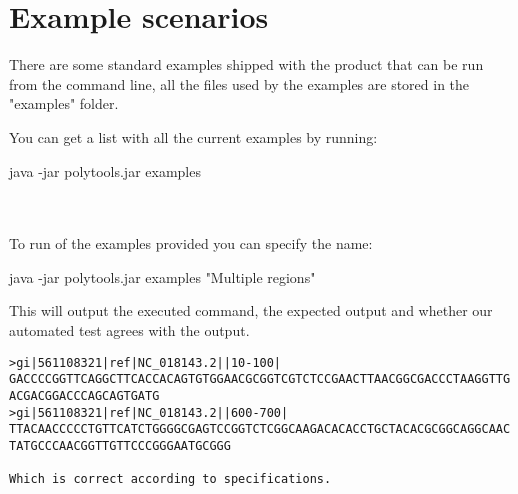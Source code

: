 \section{Example scenarios}
There are some standard examples shipped with the product that can be run from the command line, all the files used by the examples are stored in the "examples" folder.

You can get a list with all the current examples by running:\\
\begin{markdown}
java -jar polytools.jar examples
\end{markdown}
\\
\\
To run of the examples provided you can specify the name:
\\
\begin{markdown}
java -jar polytools.jar examples "Multiple regions"
\end{markdown}

This will output the executed command, the expected output and 
whether our automated test agrees with the output.
\begin{verbatim}
>gi|561108321|ref|NC_018143.2||10-100|
GACCCCGGTTCAGGCTTCACCACAGTGTGGAACGCGGTCGTCTCCGAACTTAACGGCGACCCTAAGGTTG
ACGACGGACCCAGCAGTGATG
>gi|561108321|ref|NC_018143.2||600-700|
TTACAACCCCCTGTTCATCTGGGGCGAGTCCGGTCTCGGCAAGACACACCTGCTACACGCGGCAGGCAAC
TATGCCCAACGGTTGTTCCCGGGAATGCGGG

Which is correct according to specifications.
\end{verbatim}